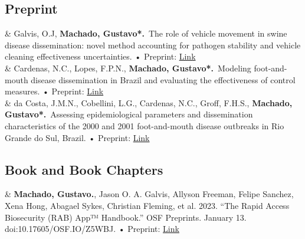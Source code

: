 \documentclass[11pt]{article}
\newcommand{\Preprint}[1]{\newline • Preprint: \faFilePdf}
\newcommand{\GitHub}[1]{\newline • Code: \faGithub\ \href{https://github.com/#1}{#1}}
\newcommand{\Year}[1]{\fontsize{10pt}{0}\selectfont #1}
\begin{document}
\subsection{Preprint}
\begin{EntriesTable}

\Year{2023}  &
Galvis, O.J, {\textbf{Machado, Gustavo*.}}\
  The role of vehicle movement in swine disease dissemination: novel method accounting for pathogen stability and vehicle cleaning effectiveness uncertainties.
  \Preprint{}\href{https://arxiv.org/abs/2212.07466}{Link}
  \\
  
\Year{2022}  &
 Cardenas, N.C., Lopes, F.P.N., {\textbf{Machado, Gustavo*.}}\
  Modeling foot-and-mouth disease dissemination in Brazil and evaluating the effectiveness of control measures.
  \Preprint{}\href{https://www.biorxiv.org/content/10.1101/2022.06.14.496159v2}{Link}
  \\

\Year{2022}  &
da Costa, J.M.N., Cobellini, L.G., Cardenas, N.C., Groff, F.H.S., {\textbf{Machado, Gustavo*.}}\ Assessing epidemiological parameters and dissemination characteristics of the 2000 and 2001 foot-and-mouth disease outbreaks in Rio Grande do Sul, Brazil.
  \Preprint{}\href{https://www.biorxiv.org/content/10.1101/2022.05.22.492961v1?rss=1}{Link}
  \\

\end{EntriesTable}

\subsection{Book and Book Chapters}
\begin{EntriesTable}

\Year{2023}  &
  \textbf{Machado, Gustavo.}, Jason O. A. Galvis, Allyson Freeman, Felipe Sanchez, Xena Hong, Abagael Sykes, Christian Fleming, et al. 2023. “The Rapid Access Biosecurity (RAB) App™ Handbook.” OSF Preprints. January 13. doi:10.17605/OSF.IO/Z5WBJ.
  \Preprint{}\href{https://osf.io/p5uwq/}{Link}
  \\
\end{EntriesTable}

\nocite{*}

\printbibliography[title=PEER-REVIEWED]

\end{document}
